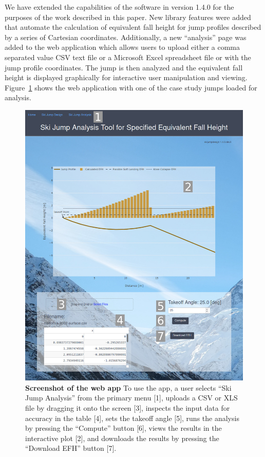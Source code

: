 \documentclass{article}
\begin{document}
We have extended the capabilities of the software in version 1.4.0 for the
purposes of the work described in this paper. New library features were added
that automate the calculation of equivalent fall height for jump profiles
described by a series of Cartesian coordinates.  Additionally, a new
``analysis'' page was added to the web application which allows users to upload
either a comma separated value CSV text file or a Microsoft Excel spreadsheet
file or with the jump profile coordinates. The jump is then analyzed and the
equivalent fall height is displayed graphically for interactive user
manipulation and viewing. Figure~\ref{fig:web-app-screenshot} shows the web
application with one of the case study jumps loaded for analysis.
%
\begin{figure}
  \centering
  \includegraphics[width=5.00in]{figures/web-app-screenshot.png}
  \caption{\textbf{Screenshot of the web app} To use the app, a user selects
    ``Ski Jump Analysis'' from the primary menu [1], uploads a CSV or XLS file
    by dragging it onto the screen [3], inspects the input data for accuracy in
    the table [4], sets the takeoff angle [5], runs the analysis by pressing
    the ``Compute'' button [6], views the results in the interactive plot [2],
    and downloads the results by pressing the ``Download EFH'' button [7].}
  \label{fig:web-app-screenshot}
\end{figure}
\end{document}
